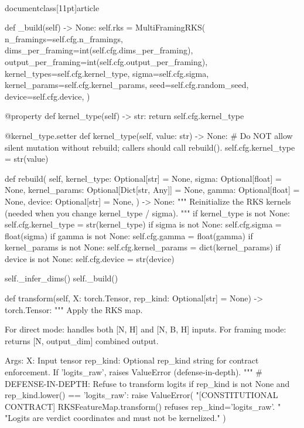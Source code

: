 \\documentclass[11pt]{article}
\begin{document}
\begin{CodeBlock}
    def _build(self) -> None:
        self.rks = MultiFramingRKS(
            n_framings=self.cfg.n_framings,
            dims_per_framing=int(self.cfg.dims_per_framing),
            output_per_framing=int(self.cfg.output_per_framing),
            kernel_types=self.cfg.kernel_type,
            sigma=self.cfg.sigma,
            kernel_params=self.cfg.kernel_params,
            seed=self.cfg.random_seed,
            device=self.cfg.device,
        )

    @property
    def kernel_type(self) -> str:
        return self.cfg.kernel_type

    @kernel_type.setter
    def kernel_type(self, value: str) -> None:
        # Do NOT allow silent mutation without rebuild; callers should call rebuild().
        self.cfg.kernel_type = str(value)

    def rebuild(
        self,
        kernel_type: Optional[str] = None,
        sigma: Optional[float] = None,
        kernel_params: Optional[Dict[str, Any]] = None,
        gamma: Optional[float] = None,
        device: Optional[str] = None,
    ) -> None:
        """
        Reinitialize the RKS kernels (needed when you change kernel_type / sigma).
        """
        if kernel_type is not None:
            self.cfg.kernel_type = str(kernel_type)
        if sigma is not None:
            self.cfg.sigma = float(sigma)
        if gamma is not None:
            self.cfg.gamma = float(gamma)
        if kernel_params is not None:
            self.cfg.kernel_params = dict(kernel_params)
        if device is not None:
            self.cfg.device = str(device)

        self._infer_dims()
        self._build()

    def transform(self, X: torch.Tensor, rep_kind: Optional[str] = None) -> torch.Tensor:
        """
        Apply the RKS map.
        
        For direct mode: handles both [N, H] and [N, B, H] inputs.
        For framing mode: returns [N, output_dim] combined output.
        
        Args:
            X: Input tensor
            rep_kind: Optional rep_kind string for contract enforcement.
                      If 'logits_raw', raises ValueError (defense-in-depth).
        """
        # DEFENSE-IN-DEPTH: Refuse to transform logits
        if rep_kind is not None and rep_kind.lower() == 'logits_raw':
            raise ValueError(
                "[CONSTITUTIONAL CONTRACT] RKSFeatureMap.transform() refuses rep_kind='logits_raw'. "
                "Logits are verdict coordinates and must not be kernelized."
            )
        

\end{CodeBlock}
\end{document}
